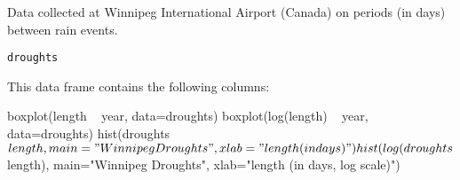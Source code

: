 \begin{Description}\relax
Data collected at Winnipeg International Airport (Canada)
on periods (in days) between rain events.
\end{Description}
\begin{Usage}
\begin{verbatim}droughts\end{verbatim}
\end{Usage}
\begin{Format}\relax
This data frame contains the following columns:
\end{Format}
\begin{Examples}
\begin{ExampleCode}
  boxplot(length ~ year, data=droughts)
  boxplot(log(length) ~ year, data=droughts)
  hist(droughts$length, main="Winnipeg Droughts", xlab="length (in days)")
  hist(log(droughts$length), main="Winnipeg Droughts", xlab="length (in days, log scale)")

\end{ExampleCode}
\end{Examples}

